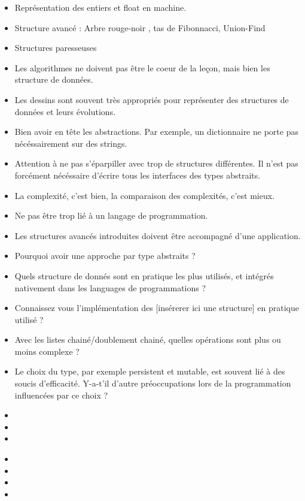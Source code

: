 \documentclass{agregfiche}
\begin{document}
\begin{itemize}
	\item Représentation des entiers et float en machine.
	\item Structure avancé : Arbre rouge-noir , tas de Fibonnacci, Union-Find
	\item Structures paresseuses
\end{itemize}

\secpieges

\begin{itemize}
	\item Les algorithmes ne doivent pas être le coeur de la leçon, mais bien les structure de données.
	\item Les dessins sont souvent très appropriés pour représenter des structures de données et leurs évolutions.
	\item Bien avoir en tête les abstractions. Par exemple, un dictionnaire ne porte pas nécéssairement sur des strings.
	\item Attention à ne pas s'éparpiller avec trop de structures différentes. Il n'est pas forcément nécéssaire d'écrire tous les interfaces des types abstraits.
	\item La complexité, c'est bien, la comparaison des complexités, c'est mieux.
	\item Ne pas être trop lié à un langage de programmation.
	\item Les structures avancés introduites doivent être accompagné d'une application.
\end{itemize}

\secquestionsclassiques

\begin{itemize}
	\item Pourquoi avoir une approche par type abstraits ?
	\item Quels structure de donnés sont en pratique les plus utilisés, et intégrés nativement dans les languages de programmations ?
	\item Connaissez vous l'implémentation des [insérerer ici une structure] en pratique utilisé ?
	\item Avec les listes chainé/doublement chainé, quelles opérations sont plus ou moins complexe ?
	\item Le choix du type, par exemple persistent et mutable, est souvent lié à des soucis d'efficacité. Y-a-t'il d'autre préoccupations lors de la programmation influencées par ce choix ?
\end{itemize}

\secreferences

\begin{itemize}
\item 
\item 
\item {}
\end{itemize}

\secdev

\begin{itemize}
\item 
\item {}
\item {}
\item {}
\end{itemize}
\end{document}
